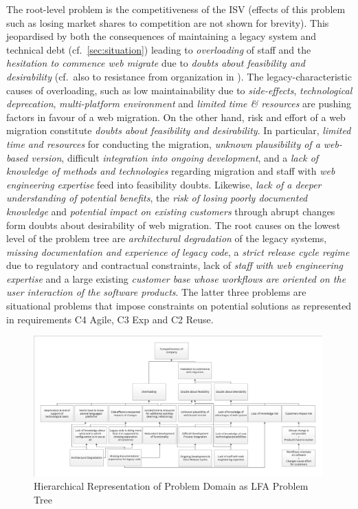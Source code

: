 The root-level problem is the competitiveness of the ISV (effects of this problem such as losing market shares to competition are not shown for brevity).
This jeopardised by both the consequences of maintaining a legacy system and technical debt (cf.~\cref{sec:situation}) leading to \emph{overloading} of staff and the \emph{hesitation to commence web migrate} due to \emph{doubts about feasibility and desirability} (cf.~also to resistance from organization in \autocite{Khadka2014ProfessionalsModernization,Sneed2010ReMiP}).
The legacy-characteristic causes of overloading, such as low maintainability due to \emph{side-effects}, \emph{technological deprecation}, \emph{multi-platform environment} and \emph{limited time \& resources} are pushing factors in favour of a web migration.
On the other hand, risk and effort of a web migration constitute \emph{doubts about feasibility and desirability}.
In particular, \emph{limited time and resources} for conducting the migration, \emph{unknown plausibility of a web-based version}, difficult \emph{integration into ongoing development}, and a \emph{lack of knowledge of methods and technologies} regarding migration and staff with \emph{web engineering expertise} feed into feasibility doubts.
Likewise, \emph{lack of a deeper understanding of potential benefits}, the \emph{risk of losing poorly documented knowledge} and \emph{potential impact on existing customers} through abrupt changes form doubts about desirability of web migration.
The root causes on the lowest level of the problem tree are \emph{architectural degradation} of the legacy systems, \emph{missing documentation and experience of legacy code}, a \emph{strict release cycle regime} due to regulatory and contractual constraints, lack of \emph{staff with web engineering expertise} and a large existing \emph{customer base whose workflows are oriented on the user interaction of the software products}.
The latter three problems are situational problems that impose constraints on potential solutions as represented in requirements C4 Agile, C3 Exp and C2 Reuse.

\begin{figure}
\hypertarget{fig:problem-tree}{%
\centering
\includegraphics[width=0.99\textwidth]{../figures/20180115-DRF-Problem-Tree.pdf}
\caption{Hierarchical Representation of Problem Domain as LFA Problem Tree}\label{fig:problem-tree}
}
\end{figure}

